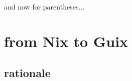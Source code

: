 \documentclass{beamer}
\begin{document}







\begin{frame}
  
  \vspace{3em}
  \huge{and now for parentheses...}

\end{frame}

\section{from Nix to Guix}

\subsection{rationale}
\end{document}
